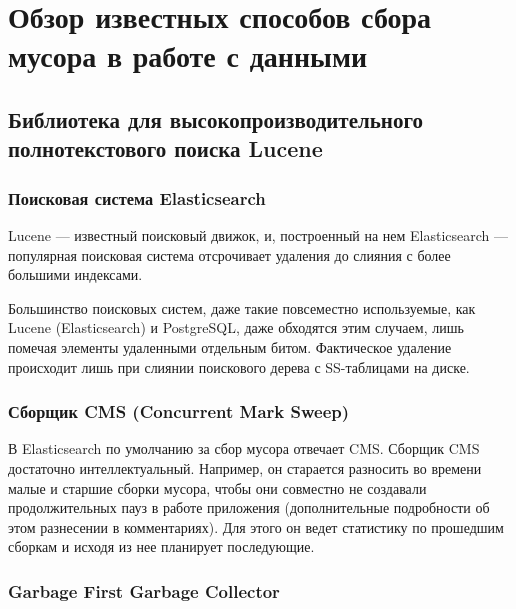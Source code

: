 \newpage
\section{Обзор известных способов сбора мусора в работе с данными}

\subsection{Библиотека для высокопроизводительного полнотекстового поиска Lucene}
\label{subsection:b_tree_indexes}

\subsubsection{Поисковая система Elasticsearch}

Lucene — известный поисковый движок, и, построенный на нем Elasticsearch —
популярная поисковая система отсрочивает удаления до слияния с более большими индексами. 

Большинство поисковых систем, даже такие повсеместно используемые, как Lucene (Elasticsearch)
и PostgreSQL, даже обходятся этим случаем, лишь помечая элементы удаленными отдельным битом.
Фактическое удаление происходит лишь при слиянии поискового дерева с SS-таблицами на диске.

\subsubsection{Сборщик CMS (Concurrent Mark Sweep)}

В Elasticsearch по умолчанию за сбор мусора отвечает CMS. Сборщик CMS достаточно интеллектуальный. Например, он старается разносить во времени малые
и старшие сборки мусора, чтобы они совместно не создавали продолжительных пауз в работе приложения
(дополнительные подробности об этом разнесении в комментариях). Для этого он ведет статистику
по прошедшим сборкам и исходя из нее планирует последующие.

\subsubsection{Garbage First Garbage Collector}

